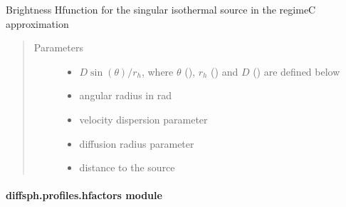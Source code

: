 \documentclass[letterpaper,10pt,english]{sphinxmanual}
\begin{document}
\begin{fulllineitems}
\label{\detokenize{diffsph.profiles:diffsph.profiles.analytics.sisbrC}}
\sphinxAtStartPar
Brightness H\sphinxhyphen{}function for the singular isothermal  source in the regime\sphinxhyphen{}C approximation
\begin{quote}\begin{description}
\item[{Parameters}] \leavevmode\begin{itemize}
\item {} 
\sphinxAtStartPar
{} \textendash{} \(D\sin(\theta)/r_h\), where \(\theta\) (), \(r_h\) () and \(D\) () are defined below

\item {} 
\sphinxAtStartPar
{} \textendash{} angular radius in rad

\item {} 
\sphinxAtStartPar
{} \textendash{} velocity dispersion parameter

\item {} 
\sphinxAtStartPar
{} \textendash{} diffusion radius parameter

\item {} 
\sphinxAtStartPar
{} \textendash{} distance to the source

\end{itemize}

\end{description}\end{quote}

\end{fulllineitems}



\paragraph{diffsph.profiles.hfactors module}
\label{\detokenize{diffsph.profiles:module-diffsph.profiles.hfactors}}\label{\detokenize{diffsph.profiles:diffsph-profiles-hfactors-module}}
\end{document}
